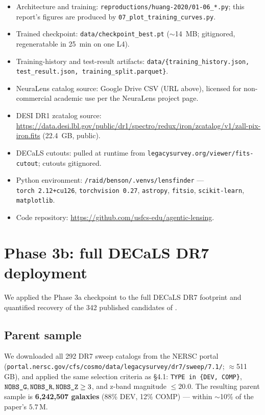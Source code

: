 \documentclass[11pt,letterpaper]{article}
\begin{document}
\begin{itemize}
\item Architecture and training: \texttt{reproductions/huang-2020/01-06\_*.py};
      this report's figures are produced by
      \texttt{07\_plot\_training\_curves.py}.
\item Trained checkpoint: \texttt{data/checkpoint\_best.pt}
      ($\sim$14~MB; gitignored, regeneratable in 25~min on one L4).
\item Training-history and test-result artifacts:
      \texttt{data/\{training\_history.json, test\_result.json,
      training\_split.parquet\}}.
\item NeuraLens catalog source: Google Drive CSV (URL above), licensed
      for non-commercial academic use per the NeuraLens project page.
\item DESI DR1 zcatalog source:
      \url{https://data.desi.lbl.gov/public/dr1/spectro/redux/iron/zcatalog/v1/zall-pix-iron.fits}
      (22.4~GB, public).
\item DECaLS cutouts: pulled at runtime from
      \texttt{legacysurvey.org/viewer/fits-cutout}; cutouts gitignored.
\item Python environment: \texttt{/raid/benson/.venvs/lensfinder} —
      \texttt{torch~2.12+cu126}, \texttt{torchvision~0.27},
      \texttt{astropy}, \texttt{fitsio}, \texttt{scikit-learn},
      \texttt{matplotlib}.
\item Code repository: \url{https://github.com/usfcs-edu/agentic-lensing}.
\end{itemize}

\section{Phase 3b: full DECaLS DR7 deployment}
\label{sec:phase3b}

We applied the Phase 3a checkpoint to the full DECaLS DR7 footprint and
quantified recovery of the 342 published candidates of
\textcite{huang2020decals}.

\subsection{Parent sample}
We downloaded all 292 DR7 sweep catalogs from the NERSC portal
(\verb|portal.nersc.gov/cfs/cosmo/data/legacysurvey/dr7/sweep/7.1/|;
$\approx$511\,GB), and applied the same selection criteria as
\textcite{huang2020decals} \S4.1: \verb|TYPE in {DEV, COMP}|,
$\verb|NOBS_G|, \verb|NOBS_R|, \verb|NOBS_Z| \geq 3$, and z-band
magnitude $\leq 20.0$. The resulting parent sample is
\textbf{6{,}242{,}507 galaxies} (88\% DEV, 12\% COMP) — within $\sim$10\%
of the paper's $5.7\,\mathrm{M}$.
\end{document}

